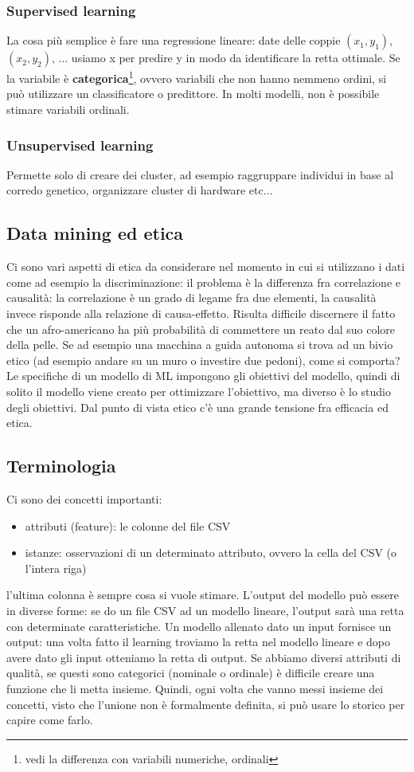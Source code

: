 \documentclass{article}
\begin{document}
\subsubsection{Supervised learning}
La cosa più semplice è fare una regressione lineare: date delle coppie $(x_1, y_1)$, $(x_2, y_2)$, ... usiamo x per predire y in modo da identificare la retta ottimale. Se la variabile è \textbf{categorica}\footnote{vedi la differenza con variabili numeriche, ordinali}, ovvero variabili che non hanno nemmeno ordini, si può utilizzare un classificatore o predittore. In molti modelli, non è possibile stimare variabili ordinali.
\subsubsection{Unsupervised learning}
Permette solo di creare dei cluster, ad esempio raggruppare individui in base al corredo genetico, organizzare cluster di hardware etc...
\subsection{Data mining ed etica}
Ci sono vari aspetti di etica da considerare nel momento in cui si utilizzano i dati come ad esempio la discriminazione: il problema è la differenza fra correlazione e causalità: la correlazione è un grado di legame fra due elementi, la causalità invece risponde alla relazione di causa-effetto. Risulta difficile discernere il fatto che un afro-americano ha più probabilità di commettere un reato dal suo colore della pelle. Se ad esempio una macchina a guida autonoma si trova ad un bivio etico (ad esempio andare su un muro o investire due pedoni), come si comporta? Le specifiche di un modello di ML impongono gli obiettivi del modello, quindi di solito il modello viene creato per ottimizzare l'obiettivo, ma diverso è lo studio degli obiettivi. Dal  punto di vista etico c'è una grande tensione fra efficacia ed etica.
\subsection{Terminologia}
Ci sono dei concetti importanti:
\begin{itemize}
\item attributi (feature): le colonne del file CSV
\item istanze: osservazioni di un determinato attributo, ovvero la cella del CSV (o l'intera riga)
\end{itemize}
l'ultima colonna è sempre cosa si vuole stimare. L'output del modello può essere in diverse forme: se do un file CSV ad un modello lineare, l'output sarà una retta con determinate caratteristiche. Un modello allenato dato un input fornisce un output: una volta fatto il learning troviamo la retta nel modello lineare e dopo avere dato gli input otteniamo la retta di output. Se abbiamo diversi attributi di qualità, se questi sono categorici (nominale o ordinale) è difficile creare una funzione che li metta insieme. Quindi, ogni volta che vanno messi insieme dei concetti, visto che l'unione non è formalmente definita, si può usare lo storico per capire come farlo.
\end{document}
